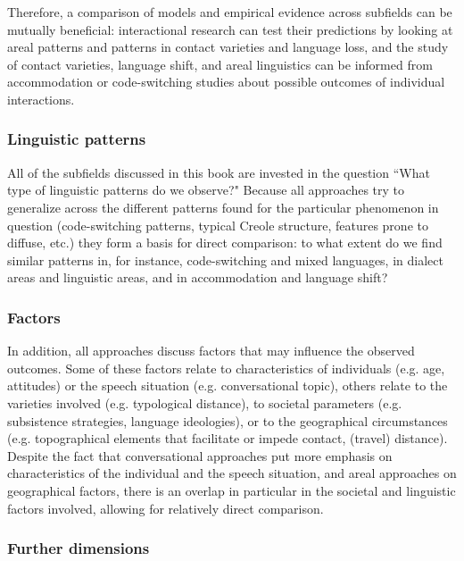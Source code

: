 Therefore, a comparison of models and empirical evidence across subfields can be mutually beneficial: interactional research can test their predictions by looking at areal patterns and patterns in contact varieties and language loss, and the study of contact varieties, language shift, and areal linguistics can be informed from accommodation or code-switching studies about possible outcomes of individual interactions.


\subsubsection*{Linguistic patterns}
All of the subfields discussed in this book are invested in the question ``What type of linguistic patterns do we observe?" Because all approaches try to generalize across the different patterns found for the particular phenomenon in question (code-switching patterns, typical Creole structure, features prone to diffuse, etc.) they form a basis for direct comparison: to what extent do we find similar patterns in, for instance, code-switching and mixed languages, in dialect areas and linguistic areas, and in accommodation and language shift?



\subsubsection*{Factors}
In addition, all approaches discuss factors that may influence the observed outcomes. Some of these factors relate to characteristics of individuals (e.g. age, attitudes) or the speech situation (e.g. conversational topic), others relate to the varieties involved (e.g. typological distance), to societal parameters (e.g. subsistence strategies, language ideologies), or to the geographical circumstances (e.g. topographical elements that facilitate or impede contact, (travel) distance). Despite the fact that conversational approaches put more emphasis on characteristics of the individual and the speech situation, and areal approaches on geographical factors, there is an overlap in particular in the societal and linguistic factors involved, allowing for relatively direct comparison.



\subsubsection*{Further dimensions}

